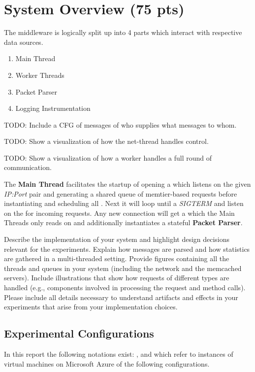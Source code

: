 \section{System Overview (75 pts)\label{sec:1}}

    The middleware is logically split up into 4 parts which interact with respective data sources.

    \begin{enumerate}
        \item Main Thread
        \item Worker Threads
        \item Packet Parser
        \item Logging Instrumentation
    \end {enumerate}

    TODO: Include a CFG of messages of who supplies what messages to whom.

    TODO: Show a visualization of how the net-thread handles control.

    TODO: Show a visualization of how a worker handles a full round of communication.

    The \textbf{Main Thread} facilitates the startup of opening a  which listens on the given
    \emph{IP:Port} pair and generating a shared queue of memtier-based requests before instantiating and scheduling all
    . Next it will loop until a \emph{SIGTERM} and listen on the  for incoming
    requests. Any new connection will get a  which the Main Threads only reads on and additionally
    instantiates a stateful \textbf{Packet Parser}.


    Describe the implementation of your system and highlight design decisions relevant for the experiments. Explain how messages are parsed and how statistics are gathered in a multi-threaded setting. Provide figures containing all the threads and queues in your system (including the network and the memcached servers). Include illustrations that show how requests of different types are handled (e.g., components involved in processing the request and method calls). Please include all details necessary to understand artifacts and effects in your experiments that arise from your implementation choices.

    \subsection{Experimental Configurations\label{subsec:1_exp-conf}}
        In this report the following notations exist: \cli, \mw{} and \srv{} which refer
        to instances of virtual machines on Microsoft Azure of the following configurations.

